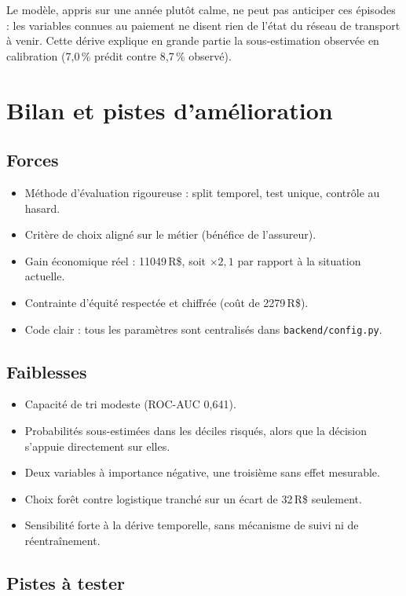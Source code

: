 \documentclass[11pt,a4paper]{article}
\newcommand{\RS}{\,R\$}
\newcommand{\var}[1]{\texttt{#1}}
\begin{document}
Le modèle, appris sur une année plutôt calme, ne peut pas anticiper ces épisodes : les
variables connues au paiement ne disent rien de l'état du réseau de transport à venir. Cette
dérive explique en grande partie la sous-estimation observée en calibration (7,0\,\% prédit
contre 8,7\,\% observé).

\section{Bilan et pistes d'amélioration}

\subsection{Forces}
\begin{itemize}
  \item Méthode d'évaluation rigoureuse : split temporel, test unique, contrôle au hasard.
  \item Critère de choix aligné sur le métier (bénéfice de l'assureur).
  \item Gain économique réel : \num{11049}\RS, soit $\times 2{,}1$ par rapport à la situation
        actuelle.
  \item Contrainte d'équité respectée et chiffrée (coût de \num{2279}\RS).
  \item Code clair : tous les paramètres sont centralisés dans \var{backend/config.py}.
\end{itemize}

\subsection{Faiblesses}
\begin{itemize}
  \item Capacité de tri modeste (ROC-AUC 0,641).
  \item Probabilités sous-estimées dans les déciles risqués, alors que la décision s'appuie
        directement sur elles.
  \item Deux variables à importance négative, une troisième sans effet mesurable.
  \item Choix forêt contre logistique tranché sur un écart de 32\RS{} seulement.
  \item Sensibilité forte à la dérive temporelle, sans mécanisme de suivi ni de réentraînement.
\end{itemize}

\subsection{Pistes à tester}
\end{document}
